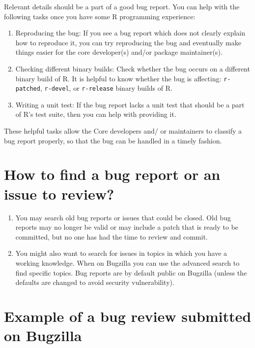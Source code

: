 \documentclass[
  letterpaper,
  DIV=11,
  numbers=noendperiod]{scrreprt}
\begin{document}
Relevant details should be a part of a good bug report. You can help
with the following tasks once you have some R programming experience:

\begin{enumerate}
\def\labelenumi{\arabic{enumi}.}
\item
  Reproducing the bug: If you see a bug report which does not clearly
  explain how to reproduce it, you can try reproducing the bug and
  eventually make things easier for the core developer(s) and/or package
  maintainer(s).
\item
  Checking different binary builds: Check whether the bug occurs on a
  different binary build of R. It is helpful to know whether the bug is
  affecting: \texttt{r-patched}, \texttt{r-devel}, or \texttt{r-release}
  binary builds of R.
\item
  Writing a unit test: If the bug report lacks a unit test that should
  be a part of R's test suite, then you can help with providing it.
\end{enumerate}

These helpful tasks allow the Core developers and/ or maintainers to
classify a bug report properly, so that the bug can be handled in a
timely fashion.

\section{How to find a bug report or an issue to
review?}\label{how-to-find-a-bug-report-or-an-issue-to-review}

\begin{enumerate}
\def\labelenumi{\arabic{enumi}.}
\item
  You may search old bug reports or issues that could be closed. Old bug
  reports may no longer be valid or may include a patch that is ready to
  be committed, but no one has had the time to review and commit.
\item
  You might also want to search for issues in topics in which you have a
  working knowledge. When on Bugzilla you can use the advanced search to
  find specific topics. Bug reports are by default public on Bugzilla
  (unless the defaults are changed to avoid security vulnerability).
\end{enumerate}

\section{Example of a bug review submitted on
Bugzilla}\label{example-of-a-bug-review-submitted-on-bugzilla}
\end{document}
